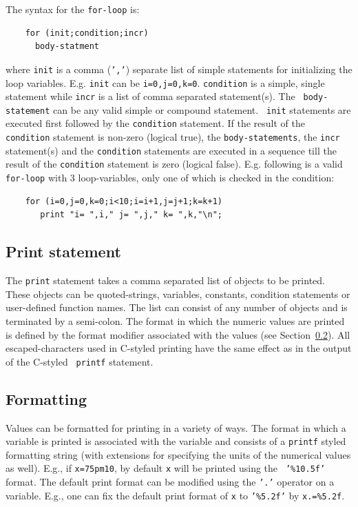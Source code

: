 \documentclass[12pt]{article}
\begin{document}
The syntax for the {\tt for-loop} is:
\begin{verbatim}
    for (init;condition;incr)
      body-statment
\end{verbatim}
where {\tt init} is a comma ({\tt ','}) separate list of simple
statements for initializing the loop variables.  E.g. {\tt init} can
be {\tt i=0,j=0,k=0}. {\tt condition} is a simple, single statement
while {\tt incr} is a list of comma separated statement(s). The {\tt
body-statement} can be any valid simple or compound statement.  {\tt
init} statements are executed first followed by the {\tt condition}
statement.  If the result of the {\tt condition} statement is non-zero
(logical true), the {\tt body-statements}, the {\tt incr} statement(s)
and the {\tt condition} statements are executed in a sequence till the
result of the {\tt condition} statement is zero (logical false).
E.g. following is a valid {\tt for-loop} with 3 loop-variables, only
one of which is checked in the condition:
\begin{verbatim}
    for (i=0,j=0,k=0;i<10;i=i+1,j=j+1;k=k+1) 
       print "i= ",i," j= ",j," k= ",k,"\n";
\end{verbatim}

\subsection{Print statement}
\label{PRINT}

The {\tt print} statement takes a comma separated list of objects to
be printed.  These objects can be quoted-strings, variables,
constants, condition statements or user-defined function names.  The
list can consist of any number of objects and is terminated by a
semi-colon.  The format in which the numeric values are printed is
defined by the format modifier associated with the values (see
Section~\ref{FORMATTING}).  All escaped-characters used in C-styled
printing have the same effect as in the output of the C-styled {\tt
printf} statement.

\subsection{Formatting}
\label{FORMATTING}

Values can be formatted for printing in a variety of ways.  The format
in which a variable is printed is associated with the variable and
consists of a {\tt printf} styled formatting string (with extensions
for specifying the units of the numerical values as well).  E.g., if
{\tt x=75pm10}, by default {\tt x} will be printed using the {\tt
'\%10.5f'} format.  The default print format can be modified using the
{\tt '.'} operator on a variable.  E.g., one can fix the default print
format of {\tt x} to {\tt '\%5.2f'} by {\tt x.=\%5.2f}.
\end{document}
